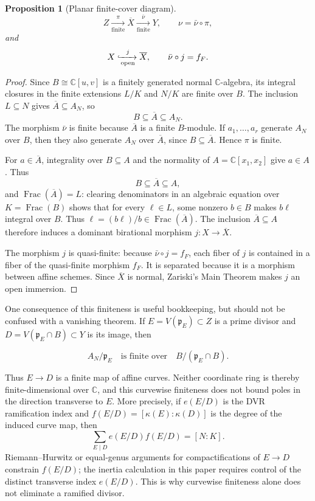 \documentclass[11pt]{article}
\newtheorem{proposition}[theorem]{Proposition}
\theoremstyle{remark}
\theoremstyle{definition}
\DeclareMathOperator{\Frac}{Frac}
\newcommand{\C}{\mathbb C}
\begin{document}
\begin{proposition}[Planar finite-cover diagram]
\label{prop:planar-normalization-diagram}
\[
  Z\xrightarrow[\mathrm{finite}]{\pi}
  \overline X\xrightarrow[\mathrm{finite}]{\bar\nu}Y,
  \qquad
  \nu=\bar\nu\circ\pi,
\]
and
\[
  X\xhookrightarrow[\mathrm{open}]{j}\overline X,
  \qquad
  \bar\nu\circ j=f_F.
\]
\end{proposition}

\begin{proof}
Since \(B\cong\C[u,v]\) is a finitely generated normal
\(\C\)-algebra, its integral closures in the finite extensions \(L/K\) and
\(N/K\) are finite over \(B\).  The inclusion \(L\subseteq N\) gives
\(\overline A\subseteq A_N\), so
\[
  B\subseteq\overline A\subseteq A_N.
\]
The morphism \(\bar\nu\) is finite because \(\overline A\) is a finite
\(B\)-module.  If \(a_1,\dots,a_r\) generate \(A_N\) over \(B\), then
they also generate \(A_N\) over \(\overline A\), since
\(B\subseteq\overline A\).  Hence \(\pi\) is finite.

For \(a\in\overline A\), integrality over \(B\subseteq A\) and the
normality of \(A=\C[x_1,x_2]\) give \(a\in A\).  Thus
  \[
  B\subseteq\overline A\subseteq A,
  \]
and \(\Frac(\overline A)=L\): clearing denominators in an algebraic
equation over \(K=\Frac(B)\) shows that for every \(\ell\in L\), some
nonzero \(b\in B\) makes \(b\ell\) integral over \(B\).  Thus
\(\ell=(b\ell)/b\in\Frac(\overline A)\).
The inclusion \(\overline A\subseteq A\) therefore induces a dominant
birational morphism \(j\colon X\to\overline X\).

The morphism \(j\) is quasi-finite: because
\(\bar\nu\circ j=f_F\), each fiber of \(j\) is contained in a fiber of
the quasi-finite morphism \(f_F\).  It is separated because it is a
morphism between affine schemes.  Since
\(\overline X\) is normal, Zariski's Main Theorem makes \(j\) an open
immersion.
\end{proof}

One consequence of this finiteness is useful bookkeeping, but should not be
confused with a vanishing theorem.  If \(E=V(\mathfrak p_E)\subset Z\) is a
prime divisor and \(D=V(\mathfrak p_E\cap B)\subset Y\) is its image, then

\[
  A_N/\mathfrak p_E
  \quad\text{is finite over}\quad
  B/(\mathfrak p_E\cap B).
\]

Thus \(E\to D\) is a finite map of affine curves.  Neither coordinate ring
is thereby finite-dimensional over \(\C\), and this curvewise finiteness does
not bound poles in the direction transverse to \(E\).  More precisely, if
\(e(E/D)\) is the DVR ramification index and
\(f(E/D)=[\kappa(E):\kappa(D)]\) is the degree of the induced curve map,
then
\[
  \sum_{E\mid D}e(E/D)f(E/D)=[N:K].
\]
Riemann--Hurwitz or equal-genus arguments for compactifications of
\(E\to D\) constrain \(f(E/D)\); the inertia calculation in this paper
requires control of the distinct transverse index \(e(E/D)\).  This is why
curvewise finiteness alone does not eliminate a ramified divisor.
\end{document}
